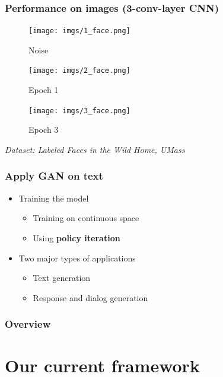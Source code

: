 \documentclass{beamer}
\begin{document}


\begin{frame}
\frametitle{Performance on images (3-conv-layer CNN)}
\begin{figure}[!htb]
  \texttt{[image: imgs/1\_face.png]}
  \caption*{Noise}\label{fig:awesome_image1}
\endminipage\hfill
{}
  \texttt{[image: imgs/2\_face.png]}
  \caption*{Epoch 1}\label{fig:awesome_image2}
\endminipage\hfill
{}%
  \texttt{[image: imgs/3\_face.png]}
  \caption*{Epoch 3}\label{fig:awesome_image3}
\endminipage
\end{figure}
\hspace{7cm}\tiny\emph{Dataset: Labeled Faces in the Wild Home, UMass}
\end{frame}


\begin{frame}
\frametitle{Apply GAN on text}
\begin{itemize}
\item Training the model 
  \begin{itemize}
    \item Training on continuous space
    \item Using \textbf{policy iteration}
  \end{itemize} 
\item Two major types of applications
	\begin{itemize}
		\item Text generation
		\item Response and dialog generation

	\end{itemize}
\end{itemize}
\end{frame}

\begin{frame}
\frametitle{Overview} 
\tableofcontents 
\end{frame}

\section{Our current framework} 
\end{document}
